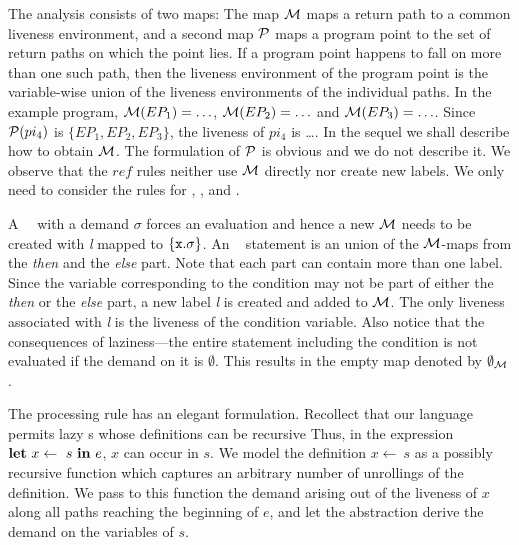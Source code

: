 \documentclass[10pt]{sigplanconf}
\begin{document}
The analysis  consists of  two maps: The  map $\cal{M}$ maps  a return
path to a common liveness environment, and a second map $\cal{P}$ maps
a program  point to the set of  return paths on which  the point lies.
If a  program point happens to fall  on more than one  such path, then
the  liveness environment of  the program  point is  the variable-wise
union of  the liveness environments  of the individual paths.   In the
example program, ${\cal M}(EP_1)= \ldots$, ${\cal M}(EP_2)=\ldots$ and
${\cal M}(EP_3)=  \ldots$.  Since  ${\cal P}(pi_4)$ is  $\lbrace EP_1,
EP_2, EP_3 \rbrace$, the liveness  of $pi_4$ is \ldots.  In the sequel
we  shall  describe  how  to  obtain $\cal{M}$.   The  formulation  of
$\cal{P}$ is obvious  and we do not describe it.   We observe that the
${ref}$  rules  neither  use   ${\cal  M}$  directly  nor  create  new
labels. We  only need  to consider the  rules for {\LET},  {\SIF}, and
{\RETURN}.

 
  A  {\RETURN~\px}\ with a  demand $\sigma$  forces an  evaluation and
  hence a  new ${\cal M}$ needs to  be created with {\em  l} mapped to
  $\lbrace \mbox{\tt x}.\sigma \rbrace$.  An \SIF~ statement is an union of the
  ${\cal M}$-maps  from the {\em then}  and the {\em  else} part. Note
  that each part  can contain more than one  label. Since the variable
  corresponding to  the condition may not  be part of  either the {\em
    then} or the  {\em else} part, a new label {\em  l} is created and
  added to $\cal{M}$. The only liveness associated with {\em l} is the
  liveness of the condition variable. Also notice that the
  consequences of laziness---the entire statement including the
  condition is not evaluated if the demand on it is
  $\emptyset$. This results in the empty map denoted by
  $\emptyset_{\cal{M}}$. 
  
  The  processing {\LET}  rule has  an elegant  formulation. Recollect
  that  our language  permits lazy  \LET  s whose  definitions can  be
  recursive Thus,  in the expression  $\mbox{$\mathbf{ let}$}~x \leftarrow~s~\mbox{$\mathbf{ in}$}~e$, $x$
  can occur  in $s$.   We model the  definition $x \leftarrow~s$  as a
  possibly recursive  function which  captures an arbitrary  number of
  unrollings of the  definition.  We pass to this  function the demand
  arising  out of the  liveness of  $x$ along  all paths  reaching the
  beginning of $e$, and let  the \Lfonly abstraction derive the demand
  on the  variables of $s$.   

\end{document}
